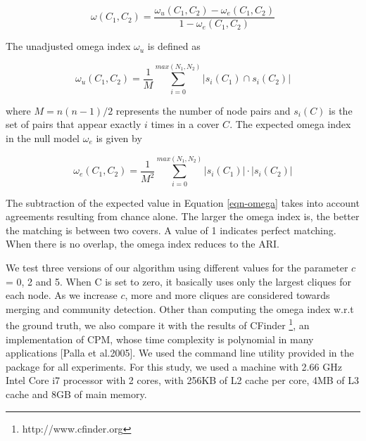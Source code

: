 \begin{equation}
\omega(C_1, C_2) = \frac{\omega_u(C_1, C_2) - \omega_e(C_1, C_2)}{1 - \omega_e(C_1, C_2)}
\label{eqn-omega}
\end{equation}

The unadjusted omega index $\omega_u$ is defined as

\begin{equation}
\omega_u(C_1, C_2) = \frac{1}{M} \sum\limits_{i=0}^{max(N_1,N_2)} \left\vert{s_i(C_1)\cap s_i(C_2)}\right\vert 
\end{equation}

where $M = n(n-1) /2$ represents the number of node pairs and $s_i(C)$ is the set of pairs that appear exactly $i$ times in a cover $C$. The expected omega index in the null model $\omega_e$ is given by

\begin{equation}
\omega_e(C_1, C_2) = \frac{1}{M^2} \sum\limits_{i=0}^{max(N_1,N_2)} \left\vert{s_i(C_1)}\right\vert \cdot \left\vert{s_i(C_2)}\right\vert 
\end{equation}

The subtraction of the expected value in Equation \ref{eqn-omega} takes into account agreements resulting from chance alone. The larger the omega index is, the better the matching is between two covers. A value of 1 indicates perfect matching. When there is no overlap, the omega index reduces to the ARI.

We test three versions of our algorithm using different values for the parameter $c$ = 0, 2 and 5. When C is set to zero, it basically uses only the largest cliques for each node. As we increase $c$, more and more cliques are considered towards merging and community detection. Other than computing the omega index w.r.t the ground truth, we also compare it with the results of CFinder \footnote{http://www.cfinder.org}, an implementation of CPM, whose time complexity is polynomial in many applications [Palla et al.2005]. We used the command line utility provided in the package for all experiments. For this study, we used a machine with 2.66 GHz Intel Core i7 processor with 2 cores, with 256KB of L2 cache per core, 4MB of L3 cache and 8GB of main memory.




